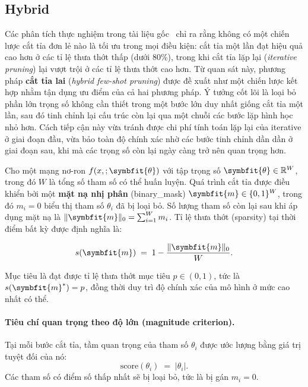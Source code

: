 \subsection{Hybrid}
Các phân tích thực nghiệm trong tài liệu gốc~\cite{hybrid} chỉ ra rằng không có một chiến lược cắt tỉa đơn lẻ nào là tối ưu trong mọi điều kiện: cắt tỉa một lần đạt hiệu quả cao hơn ở các tỉ lệ thưa thớt thấp (dưới $80\%$), trong khi cắt tỉa lặp lại (\textit{iterative pruning}) lại vượt trội ở các tỉ lệ thưa thớt cao hơn.
Từ quan sát này, phương pháp \textbf{cắt tỉa lai} (\textit{hybrid few-shot pruning}) được đề xuất như một chiến lược kết hợp nhằm tận dụng ưu điểm của cả hai phương pháp.
Ý tưởng cốt lõi là loại bỏ phần lớn trọng số không cần thiết trong một bước lớn duy nhất giống cắt tỉa một lần, sau đó tinh chỉnh lại cấu trúc còn lại qua một chuỗi các bước lặp hình học nhỏ hơn.
Cách tiếp cận này vừa tránh được chi phí tính toán lặp lại của iterative \pruning ở giai đoạn đầu, vừa bảo toàn độ chính xác nhờ các bước tinh chỉnh dần dần ở giai đoạn sau, khi mà các trọng số còn lại ngày càng trở nên quan trọng hơn.

Cho một mạng nơ-ron $f(x,;\symbfit{\theta})$ với tập trọng số
$\symbfit{\theta} \in \mathbb{R}^{W}$, trong đó $W$ là tổng số tham số có thể huấn luyện.
Quá trình cắt tỉa được điều khiển bởi một \textbf{mặt nạ nhị phân}
(\gls{binary_mask})
$\symbfit{m} \in \{0,1\}^{W}$,
trong đó $m_i = 0$ biểu thị tham số $\theta_i$ đã bị loại bỏ.
Số lượng tham số còn lại sau khi áp dụng mặt nạ là
$\|\symbfit{m}\|_0 = \sum_{i=1}^{W} m_i$.
Tỉ lệ thưa thớt (sparsity) tại thời điểm bất kỳ được định nghĩa là:

\begin{equation}
    s(\symbfit{m}) \;=\; 1 - \frac{\|\symbfit{m}\|_0}{W}.
    \label{eq:sparsity}
\end{equation}

Mục tiêu là đạt được tỉ lệ thưa thớt mục tiêu $p \in (0,1)$, tức là
$s(\symbfit{m}^*) = p$, đồng thời duy trì độ chính xác của mô hình ở mức cao nhất có thể.

\paragraph{\textbf{Tiêu chí quan trọng theo độ lớn (magnitude criterion).}}
Tại mỗi bước cắt tỉa, tầm quan trọng của tham số $\theta_i$ được ước lượng bằng giá trị tuyệt đối của nó:
\begin{equation}
    \text{score}(\theta_i) \;=\; |\theta_i|.
    \label{eq:magnitude}
\end{equation}
Các tham số có điểm số thấp nhất sẽ bị loại bỏ, tức là bị gán $m_i = 0$.

